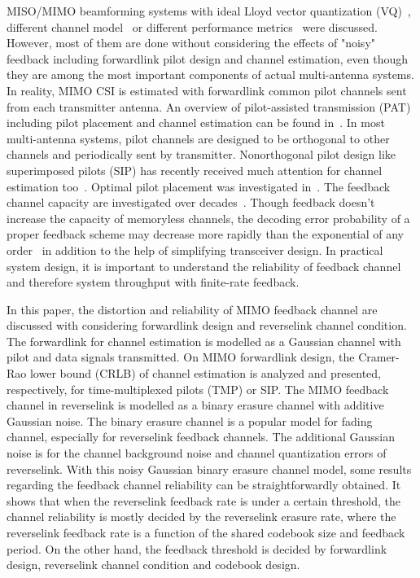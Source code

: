 \documentclass[10pt,fleqn, twocolumn]{IEEEtran}
\begin{document}
MISO/MIMO beamforming systems with ideal Lloyd vector quantization
(VQ)~\cite{Narula98}, different channel model~\cite{Mukka03} or
different performance metrics~\cite{PXia04,Roh04} were discussed.
However, most of them are done without considering the effects of
"noisy" feedback including forwardlink pilot design and channel
estimation, even though they are among the most important
components of actual multi-antenna systems. In reality, MIMO CSI
is estimated with forwardlink common pilot channels sent from each
transmitter antenna. An overview of pilot-assisted transmission
(PAT) including pilot placement and channel estimation can be
found in~\cite{Tong04}. In most multi-antenna systems, pilot
channels are designed to be orthogonal to other channels and
periodically sent by transmitter. Nonorthogonal pilot design like
superimposed pilots (SIP) has recently received much attention for
channel estimation too~\cite{Coldrey06}. Optimal pilot placement
was investigated in~\cite{Dong02}. The feedback channel capacity
are investigated over decades~\cite{Shannon56,Kim06}. Though
feedback doesn't increase the capacity of memoryless channels, the
decoding error probability of a proper feedback scheme may
decrease more rapidly than the exponential of any
order~\cite{Kramer69} in addition to the help of simplifying
transceiver design. In practical system design, it is important to
understand the reliability of feedback channel and therefore
system throughput with finite-rate feedback.

In this paper, the distortion and reliability of MIMO feedback
channel are discussed with considering forwardlink design and
reverselink channel condition. The forwardlink for channel
estimation is modelled as a Gaussian channel with pilot and data
signals transmitted. On MIMO forwardlink design, the Cramer-Rao
lower bound (CRLB) of channel estimation is analyzed and
presented, respectively, for time-multiplexed pilots (TMP) or SIP.
The MIMO feedback channel in reverselink is modelled as a binary
erasure channel with additive Gaussian noise. The binary erasure
channel is a popular model for fading channel, especially for
reverselink feedback channels. The additional Gaussian noise is
for the channel background noise and channel quantization errors
of reverselink. With this noisy Gaussian binary erasure channel
model, some results regarding the feedback channel reliability can
be straightforwardly obtained. It shows that when the reverselink
feedback rate is under a certain threshold, the channel
reliability is mostly decided by the reverselink erasure rate,
where the reverselink feedback rate is a function of the shared
codebook size and feedback period. On the other hand, the feedback
threshold is decided by forwardlink design, reverselink channel
condition and codebook design.
\end{document}

